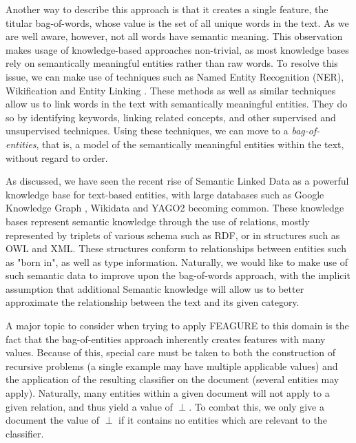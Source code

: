 \documentclass[twoside,11pt]{article}
\theoremstyle{definition}
\begin{document}
Another way to describe this approach is that it creates a single feature, the titular bag-of-words, whose value is the set of all unique words in the text.
As we are well aware, however, not all words have semantic meaning. This observation makes usage of knowledge-based approaches non-trivial, as most knowledge bases rely on semantically meaningful entities rather than raw words.
To resolve this issue, we can make use of techniques such as Named Entity Recognition (NER), Wikification \cite{bunescu2006using} and Entity Linking \cite{rao2013entity}. These methods as well as similar techniques allow us to link words in the text with semantically meaningful entities. They do so by identifying keywords, linking related concepts, and other supervised and unsupervised techniques.
Using these techniques, we can move to a \emph{bag-of-entities}, that is, a model of the semantically meaningful entities within the text, without regard to order.

As discussed, we have seen the recent rise of Semantic Linked Data as a powerful knowledge base for text-based entities, with large databases such as Google Knowledge Graph \cite{pelikanova2014google}, Wikidata \cite{vrandevcic2014wikidata} and YAGO2 \cite{hoffart2013yago2} becoming common. 
These knowledge bases represent semantic knowledge through the use of relations, mostly represented by triplets of various schema such as RDF, or in structures such as OWL and XML. These structures conform to relationships between entities such as "born in", as well as type information.
Naturally, we would like to make use of such semantic data to improve upon the bag-of-words approach, with the implicit assumption that additional Semantic knowledge will allow us to better approximate the relationship between the text and its given category.

A major topic to consider when trying to apply FEAGURE to this domain is the fact that the bag-of-entities approach inherently creates features with many values. Because of this, special care must be taken to both the construction of recursive problems (a single example may have multiple applicable values) and the application of the resulting classifier on the document (several entities may apply).
Naturally, many entities within a given document will not apply to a given relation, and thus yield a value of $\perp$. To combat this, we only give a document the value of $\perp$ if it contains no entities which are relevant to the classifier.

\end{document}
